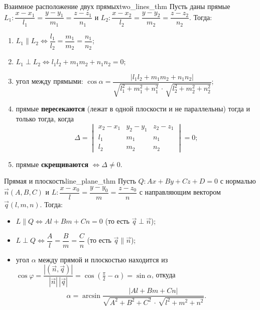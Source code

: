 \documentclass[12pt,a4paper]{article}
\begin{document}
\begin{theorem}{Взаимное расположение двух прямых}{two_lines_thm}
  Пусть даны прямые
  $L_1\colon \dfrac{x-x_1}{l_1} = \dfrac{y-y_1}{m_1} = \dfrac{z-z_1}{n_1}$
  и
  $L_2\colon \dfrac{x-x_2}{l_2} = \dfrac{y-y_2}{m_2} = \dfrac{z-z_2}{n_2}$.
  Тогда:
  \begin{enumerate}
    \item $L_1 \parallel L_2 \iff
      \dfrac{l_1}{l_2} = \dfrac{m_1}{m_2} = \dfrac{n_1}{n_2}$;
    \item $L_1 \perp L_2 \iff l_1l_2 + m_1m_2 + n_1n_2 = 0$;
    \item угол между прямыми:
      $\cos\alpha = \dfrac{|l_1l_2 + m_1m_2 + n_1n_2|}
      {\sqrt{l_1^2+m_1^2+n_1^2}\,\cdot\,\sqrt{l_2^2+m_2^2+n_2^2}}$;
    \item прямые \textbf{пересекаются} (лежат в одной плоскости и не
      параллельны) тогда и только тогда, когда
      \[
        \Delta =
        \begin{vmatrix}
          x_2 - x_1 & y_2 - y_1 & z_2 - z_1 \\
          l_1 & m_1 & n_1 \\
          l_2 & m_2 & n_2
        \end{vmatrix} = 0;
      \]
    \item прямые \textbf{скрещиваются} $\iff \Delta \neq 0$.
  \end{enumerate}
\end{theorem}

\begin{theorem}{Прямая и плоскость}{line_plane_thm}
  Пусть $Q\colon Ax + By + Cz + D = 0$ с нормалью $\vec{n}(A,B,C)$ и
  $L\colon \dfrac{x-x_0}{l} = \dfrac{y-y_0}{m} = \dfrac{z-z_0}{n}$ с
  направляющим вектором $\vec{q}(l,m,n)$. Тогда:
  \begin{itemize}
    \item $L \parallel Q \iff Al + Bm + Cn = 0$
      (то есть $\vec{q} \perp \vec{n}$);
    \item $L \perp Q \iff \dfrac{A}{l} = \dfrac{B}{m} = \dfrac{C}{n}$
      (то есть $\vec{q} \parallel \vec{n}$);
    \item угол $\alpha$ между прямой и плоскостью находится из
      $\cos\varphi = \dfrac{|(\vec{n}, \vec{q})|}{|\vec{n}|\,|\vec{q}|}
      = \cos\!\left(\tfrac{\pi}{2} - \alpha\right) = \sin\alpha$,
      откуда
      \[
        \alpha = \arcsin\frac{|Al + Bm + Cn|}
        {\sqrt{A^2+B^2+C^2}\,\cdot\,\sqrt{l^2+m^2+n^2}}.
      \]
  \end{itemize}
\end{theorem}
\end{document}
